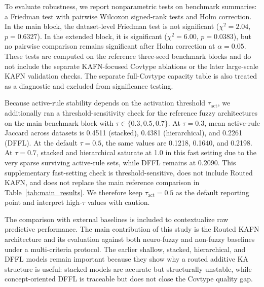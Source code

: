 \documentclass[runningheads]{llncs}
\begin{document}
To evaluate robustness, we report nonparametric tests on benchmark summaries: a Friedman test with pairwise Wilcoxon signed-rank tests and Holm correction. In the main block, the dataset-level Friedman test is not significant ($\chi^2=2.04$, $p=0.6327$). In the extended block, it is significant ($\chi^2=6.00$, $p=0.0383$), but no pairwise comparison remains significant after Holm correction at $\alpha=0.05$.
These tests are computed on the reference three-seed benchmark blocks and do not include the separate KAFN-focused Covtype ablations or the later large-scale KAFN validation checks. The separate full-Covtype capacity table is also treated as a diagnostic and excluded from significance testing.

Because active-rule stability depends on the activation threshold $\tau_{\mathrm{act}}$, we additionally ran a threshold-sensitivity check for the reference fuzzy architectures on the main benchmark block with $\tau\in\{0.3,0.5,0.7\}$. At $\tau=0.3$, mean active-rule Jaccard across datasets is 0.4511 (stacked), 0.4381 (hierarchical), and 0.2261 (DFFL). At the default $\tau=0.5$, the same values are 0.1218, 0.1640, and 0.2198. At $\tau=0.7$, stacked and hierarchical saturate at 1.0 in this fast setting due to the very sparse surviving active-rule sets, while DFFL remains at 0.2090. This supplementary fast-setting check is threshold-sensitive, does not include Routed KAFN, and does not replace the main reference comparison in Table~\ref{tab:main_results}. We therefore keep $\tau_{\mathrm{act}}=0.5$ as the default reporting point and interpret high-$\tau$ values with caution.

The comparison with external baselines is included to contextualize raw predictive performance. The main contribution of this study is the Routed KAFN architecture and its evaluation against both neuro-fuzzy and non-fuzzy baselines under a multi-criteria protocol. The earlier shallow, stacked, hierarchical, and DFFL models remain important because they show why a routed additive KA structure is useful: stacked models are accurate but structurally unstable, while concept-oriented DFFL is traceable but does not close the Covtype quality gap.
\end{document}
